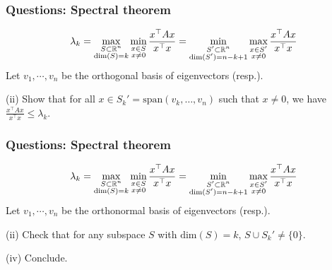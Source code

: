 \documentclass{beamer}
\begin{document}
\begin{frame}[t]
\frametitle{Questions: Spectral theorem}
\vspace{-15pt}
\begin{align*}
\lambda_k = \max_{\substack{S \subset \mathbb{R}^n \\ \text{dim}(S) = k}} \min_{\substack{x \in S \\ x \neq 0}} \frac{x^\top A x}{x^\top x} = \min_{\substack{S' \subset \mathbb{R}^n \\ \text{dim}(S') = n-k+1}} \max_{\substack{x \in S' \\ x \neq 0}} \frac{x^\top A x}{x^\top x}
\end{align*}
Let $v_1, \cdots, v_n$ be the orthogonal basis of eigenvectors (resp.).

(ii) Show that for all $x \in S_k' = \text{span}(v_k, \dots, v_n)$ such that $x \neq 0$, we have  $\frac{x^\top A x}{x^\top x} \leq \lambda_k$.
\end{frame}

\begin{frame}[t]
\frametitle{Questions: Spectral theorem}
\vspace{-15pt}
\begin{align*}
\lambda_k = \max_{\substack{S \subset \mathbb{R}^n \\ \text{dim}(S) = k}} \min_{\substack{x \in S \\ x \neq 0}} \frac{x^\top A x}{x^\top x} = \min_{\substack{S' \subset \mathbb{R}^n \\ \text{dim}(S') = n-k+1}} \max_{\substack{x \in S' \\ x \neq 0}} \frac{x^\top A x}{x^\top x}
\end{align*}
Let $v_1, \cdots, v_n$ be the orthonormal basis of eigenvectors (resp.).

(ii) Check that for any subspace $S$ with $\text{dim}(S) = k$, $S \cup S_k' \neq \{0\}$.

(iv) Conclude.
\end{frame}
\fi

\iffalse
\begin{frame}[t]
\frametitle{Extra question: Spectral theorem}
For a symmetric matrix, show how you can use a modification of Gaussian elimination to find a decomposition $A = V \Lambda V^\top$ for some diagonal matrix $\Lambda$.
\end{frame}
\fi

\begin{frame}[t]

\end{frame}

\begin{frame}[t]

\end{frame}
\end{document}
